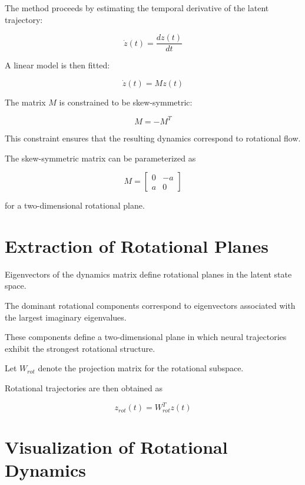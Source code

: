 \documentclass[11pt]{report}
\begin{document}
The method proceeds by estimating the temporal derivative of the
latent trajectory:

\begin{equation}
\dot{z}(t) =
\frac{dz(t)}{dt}
\end{equation}

A linear model is then fitted:

\begin{equation}
\dot{z}(t) = M z(t)
\end{equation}

The matrix $M$ is constrained to be skew-symmetric:

\begin{equation}
M = -M^T
\end{equation}

This constraint ensures that the resulting dynamics correspond
to rotational flow.

The skew-symmetric matrix can be parameterized as

\begin{equation}
M =
\begin{bmatrix}
0 & -a \\
a & 0
\end{bmatrix}
\end{equation}

for a two-dimensional rotational plane.

\section{Extraction of Rotational Planes}

Eigenvectors of the dynamics matrix define rotational planes in
the latent state space.

The dominant rotational components correspond to eigenvectors
associated with the largest imaginary eigenvalues.

These components define a two-dimensional plane in which neural
trajectories exhibit the strongest rotational structure.

Let $W_{rot}$ denote the projection matrix for the rotational
subspace.

Rotational trajectories are then obtained as

\begin{equation}
z_{rot}(t) = W_{rot}^{T} z(t)
\end{equation}

\section{Visualization of Rotational Dynamics}
\end{document}
